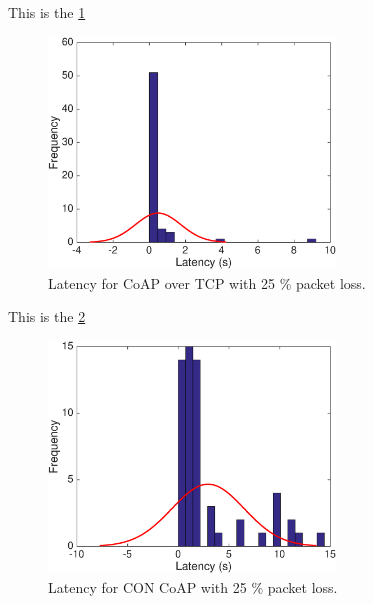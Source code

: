 

This is the \figurename \ref{coapovertcploss}
\begin{figure}[bh]
	\centering
	\includegraphics[width=3in]{gfx/coapovertcp25loss}
	\caption{Latency for CoAP over TCP with 25 \% packet loss.}
	\label{coapovertcploss}
\end{figure}

This is the \figurename \ref{coapoverudploss}
\begin{figure}[bh]
	\centering
	\includegraphics[width=3in]{gfx/coapoverudp25loss}
	\caption{Latency for CON CoAP with 25 \% packet loss.}
	\label{coapoverudploss}
\end{figure}

